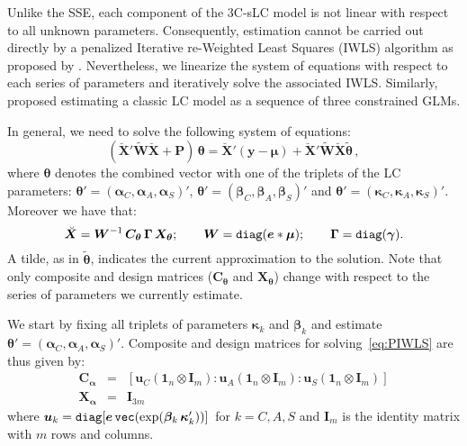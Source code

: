 \documentclass[Thesis]{subfiles}
\begin{document}
Unlike the SSE, each component of the 3C-sLC model is not linear with respect to all unknown parameters. Consequently, estimation cannot be carried out directly by a penalized Iterative re-Weighted Least Squares (IWLS) algorithm as proposed by \citet{eilers2007ill}. Nevertheless, we linearize the system of equations with respect to each series of parameters and iteratively solve the associated IWLS. Similarly, \citet{currie2013smoothing} proposed estimating a classic LC model as a sequence of three constrained GLMs. 

In general, we need to solve the following system of equations:
\begin{equation} \label{eq:PIWLS}
(\breve{\bm{X}}' \tilde{\bm{W}} \breve{\bm{X}}  + \bm{P})\,\bm{\theta} =
\breve{\bm{X}}'(\bm{y} - \bm{\mu}) + \breve{\bm{X}}' \tilde{\bm{W}}
\breve{\bm{X}} \tilde{\bm{\theta}} \, ,
\end{equation}
where $\bm{\theta}$ denotes the combined vector with one of the triplets of the LC parameters: $\bm{\theta}' = (\bm{\alpha}_{C}, \bm{\alpha}_{A} , \bm{\alpha}_{S})'$, $\bm{\theta}' = (\bm{\beta}_{C}, \bm{\beta}_{A} , \bm{\beta}_{S})'$ and $\bm{\theta}' = (\bm{\kappa}_{C}, \bm{\kappa}_{A} , \bm{\kappa}_{S})'$.
Moreover we have that: 
\begin{equation}\label{eq:IWLSelem}
\breve{\bm{X}} = \bm{W}^{-1}\, \bm{C}_{\bm{\theta}}\,\bm{\Gamma}\,\bm{X}_{\bm{\theta}}; \qquad \bm{W}=
\verb"diag"(\bm{e}*\bm{\mu}); \qquad \bm{\Gamma}= \verb"diag"(\bm{\gamma}) .
\end{equation}
A tilde, as in $\tilde{\bm{\theta}}$, indicates the current approximation to the solution. Note that only composite and design matrices ($\bm{C}_{\bm{\theta}}$ and 
$\bm{X}_{\bm{\theta}}$) change with respect to the series of parameters we currently estimate. 

We start by fixing all triplets of parameters $\bm{\kappa}_{k}$ and $\bm{\beta}_{k}$ and estimate $\bm{\theta}' = (\bm{\alpha}_{C}, \bm{\alpha}_{A} , \bm{\alpha}_{S})'$. Composite and design matrices for solving~\eqref{eq:PIWLS} are thus given by: 
\begin{eqnarray}\label{eq:CXalpha}\nonumber
\bm{C}_{\bm{\alpha}} &=& [\bm{u}_{C} (\bm{1}_{n}\otimes \bm{I}_{m}) :
\bm{u}_{A} (\bm{1}_{n}\otimes \bm{I}_{m}) : \bm{u}_{S}
(\bm{1}_{n}\otimes \bm{I}_{m}) ]\\
\bm{X}_{\bm{\alpha}} &=& \bm{I}_{3m}
\end{eqnarray}
where $\bm{u}_{k} = \verb"diag"[\bm{e} \, \verb"vec"(\exp(\bm{\beta}_{k}\,\bm{\kappa}_{k}')) ]\,$ for $k=C,A,S$ and $\bm{I}_{m}$ is the identity matrix with $m$ rows and columns.
\end{document}
